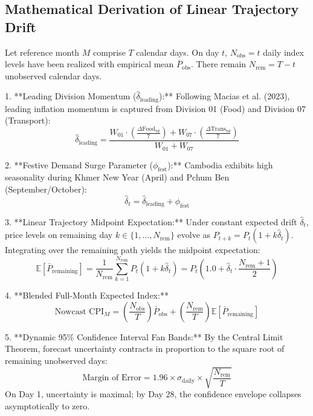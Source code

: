 \documentclass[11pt,a4paper,oneside]{article}
\begin{document}
\subsection{Mathematical Derivation of Linear Trajectory Drift}
Let reference month $M$ comprise $T$ calendar days. On day $t$, $N_{\text{obs}} = t$ daily index levels have been realized with empirical mean $\bar{P}_{\text{obs}}$. There remain $N_{\text{rem}} = T - t$ unobserved calendar days.

1. **Leading Division Momentum ($\hat{\delta}_{\text{leading}}$):**
Following Macias et al. (2023), leading inflation momentum is captured from Division 01 (Food) and Division 07 (Transport):
\begin{equation}
\hat{\delta}_{\text{leading}} = \frac{W_{01} \cdot \left(\frac{\Delta \text{Food}_{7d}}{7}\right) + W_{07} \cdot \left(\frac{\Delta \text{Trans}_{7d}}{7}\right)}{W_{01} + W_{07}}
\end{equation}

2. **Festive Demand Surge Parameter ($\phi_{\text{fest}}$):**
Cambodia exhibits high seasonality during Khmer New Year (April) and Pchum Ben (September/October):
\begin{equation}
\hat{\delta}_t = \hat{\delta}_{\text{leading}} + \phi_{\text{fest}}
\end{equation}

3. **Linear Trajectory Midpoint Expectation:**
Under constant expected drift $\hat{\delta}_t$, price levels on remaining day $k \in \{1, \dots, N_{\text{rem}}\}$ evolve as $P_{t+k} = P_t (1 + k \hat{\delta}_t)$. Integrating over the remaining path yields the midpoint expectation:
\begin{equation}
\mathbb{E}[\bar{P}_{\text{remaining}}] = \frac{1}{N_{\text{rem}}} \sum_{k=1}^{N_{\text{rem}}} P_t (1 + k \hat{\delta}_t) = P_t \left( 1.0 + \hat{\delta}_t \cdot \frac{N_{\text{rem}} + 1}{2} \right)
\end{equation}

4. **Blended Full-Month Expected Index:**
\begin{equation}
\text{Nowcast CPI}_M = \left( \frac{N_{\text{obs}}}{T} \right) \bar{P}_{\text{obs}} + \left( \frac{N_{\text{rem}}}{T} \right) \mathbb{E}[\bar{P}_{\text{remaining}}]
\end{equation}

5. **Dynamic 95\% Confidence Interval Fan Bands:**
By the Central Limit Theorem, forecast uncertainty contracts in proportion to the square root of remaining unobserved days:
\begin{equation}
\text{Margin of Error} = 1.96 \times \sigma_{\text{daily}} \times \sqrt{\frac{N_{\text{rem}}}{T}}
\end{equation}
On Day 1, uncertainty is maximal; by Day 28, the confidence envelope collapses asymptotically to zero.
\end{document}
